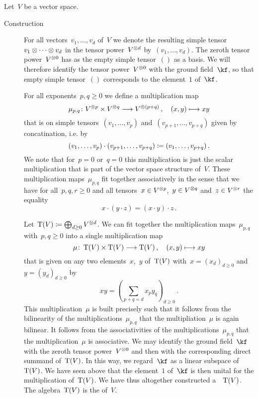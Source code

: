 \begin{recall}
	Let~$V$ be a vector space.
	\begin{description}
		\item[Construction]
			For all vectors~$v_1, \dotsc, v_d$ of~$V$ we denote the resulting simple tensor~$v_1 \otimes \dotsb \otimes v_d$ in the tensor power~$V^{\otimes d}$ by~$(v_1, \dotsc, v_d)$.
			The zeroth tensor power~$V^{\otimes 0}$ has as the empty simple tensor~$()$ as a basis.
			We will therefore identify the tensor power~$V^{\otimes 0}$ with the ground field~$\kf$, so that empty simple tensor~$()$ corresponds to the element~$1$ of~$\kf$.
			
			For all exponents~$p, q \geq 0$ we define a multiplication map
			\[
				\mu_{p,q}
				\colon
				V^{\tensor p} \times V^{\tensor q}
				\to
				V^{\tensor (p+q)} \,,
				\quad
				(x,y)
				\mapsto
				x y
			\]
			that is on simple tensors~$(v_1, \dotsc, v_p)$ and~$(v_{p+1}, \dotsc, v_{p+q})$ given by concatination, i.e. by
			\[
				(v_1, \dotsc, v_p) \cdot (v_{p+1}, \dotsc, v_{p+q})
				\coloneqq
				(v_1, \dotsc, v_{p+q})  \,.
			\]
			We note that for~$p = 0$ or~$q = 0$ this multiplication is just the scalar multiplication that is part of the vector space structure of~$V$.
			These multiplication maps~$\mu_{p,q}$ fit together associatively in the sense that we have for all~$p, q, r \geq 0$ and all tensors~$x \in V^{\otimes p}$,~$y \in V^{\otimes q}$ and~$z \in V^{\otimes r}$ the equality
			\[
				x \cdot (y \cdot z)
				=
				(x \cdot y) \cdot z \,.
			\]
			
			Let~$\operatorname{T}(V) \coloneqq \bigoplus_{d \geq 0} V^{\otimes d}$.
			We can fit together the multiplication maps~$\mu_{p,q}$ with~$p, q \geq 0$ into a single multiplication map
			\[
				\mu
				\colon
				\Tensor(V) \times \Tensor(V)
				\to
				\Tensor(V)  \,,
				\quad
				(x,y)
				\mapsto
				xy 
			\]
			that is given on any two elements~$x$,~$y$ of~$\operatorname{T}(V)$ with~$x = (x_d)_{d \geq 0}$ and~$y = (y_d)_{d \geq 0}$ by
			\[
				x y
				=
				\left(
					\sum_{p+q = d} x_p y_q
				\right)_{d \geq 0} \,.
			\]
			This multiplication~$\mu$ is built precisely such that it follows from the bilinearity of the multiplications~$\mu_{p,q}$ that the multipliation~$\mu$ is again bilinear.
			It follows from the associativities of the multiplications~$\mu_{p,q}$ that the multiplication~$\mu$ is associative.
			We may identify the ground field~$\kf$ with the zeroth tensor power~$V^{\otimes 0}$ and then with the corresponding direct summand of~$\operatorname{T}(V)$.
			In this way, we regard~$\kf$ as a linear subspace of~$\operatorname{T}(V)$.
			We have seen above that the element~$1$ of~$\kf$ is then unital for the multiplication of~$\operatorname{T}(V)$.
			We have thus altogether constructed a~{\algebra{$\kf$}}~$\operatorname{T}(V)$.
			The algebra~$\operatorname{T}(V)$ is the  of~$V$.
			

\end{description}
\end{recall}
